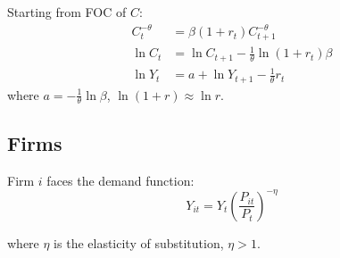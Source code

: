 \documentclass[12pt]{article}
\begin{document}
Starting from FOC of $ C $:
\begin{align*}
C_{t}^{ - \theta}&= \beta(1 + r_{t})C_{t + 1}^{ - \theta}\\
\ln C_{t} &= \ln C_{t + 1} - \frac{1}{\theta}\ln (1 + r_{t})\beta\\
\ln Y_{t} &= a + \ln Y_{t + 1} - \frac{1}{\theta}r_{t}
\end{align*}
where $ a =  - \frac{1}{\theta}\ln \beta $, $ \ln (1 + r) \approx \ln r $.


\subsection{Firms}
Firm $ i $ faces the demand function:
\begin{equation*}
Y_{it} = Y_{t}\left( \frac{P_{it}}{P_{t}} \right) ^{ - \eta}
\end{equation*}

where $ \eta $ is the elasticity of substitution, $ \eta > 1 $.

















\end{document}
